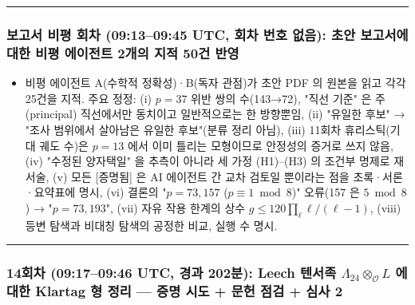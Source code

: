 \begin{center}\rule{0.5\linewidth}{0.5pt}\end{center}

\hypertarget{uxbcf4uxace0uxc11c-uxbe44uxd3c9-uxd68cuxcc28-09130945-utc-uxd68cuxcc28-uxbc88uxd638-uxc5c6uxc74c-uxcd08uxc548-uxbcf4uxace0uxc11cuxc5d0-uxb300uxd55c-uxbe44uxd3c9-uxc5d0uxc774uxc804uxd2b8-2uxac1cuxc758-uxc9c0uxc801-50uxac74-uxbc18uxc601}{%
\subsubsection*{보고서 비평 회차 (09:13--09:45 UTC, 회차 번호 없음): 초안 보고서에 대한 비평 에이전트 2개의 지적 50건 반영}\label{uxbcf4uxace0uxc11c-uxbe44uxd3c9-uxd68cuxcc28-09130945-utc-uxd68cuxcc28-uxbc88uxd638-uxc5c6uxc74c-uxcd08uxc548-uxbcf4uxace0uxc11cuxc5d0-uxb300uxd55c-uxbe44uxd3c9-uxc5d0uxc774uxc804uxd2b8-2uxac1cuxc758-uxc9c0uxc801-50uxac74-uxbc18uxc601}}

\begin{itemize}
\tightlist
\item
  비평 에이전트 A(수학적 정확성)·B(독자 관점)가 초안 PDF 의 원본을 읽고 각각 25건을 지적. 주요 정정: (i) \(p=37\) 위반 쌍의 수(143→72), "직선 기준" 은 주(principal) 직선에서만 동치이고 일반적으로는 한 방향뿐임, (ii) "유일한 후보" → "조사 범위에서 살아남은 유일한 후보"(분류 정리 아님), (iii) 11회차 휴리스틱(기대 궤도 수)은 \(p=13\) 에서 이미 틀리는 모형이므로 안정성의 증거로 쓰지 않음, (iv) "수정된 양자택일" 을 추측이 아니라 세 가정 (H1)--(H3) 의 조건부 명제로 재서술, (v) 모든 {[}증명됨{]} 은 AI 에이전트 간 교차 검토일 뿐이라는 점을 초록·서론·요약표에 명시, (vi) 결론의 "\(p=73,157\) (\(p\equiv1\bmod8\))" 오류(157 은 \(5\bmod8\)) → "\(p=73,193\)", (vii) 자유 작용 한계의 상수 \(g\le120\prod_\ell\ell/(\ell-1)\), (viii) 등변 탐색과 비대칭 탐색의 공정한 비교, 실행 수 명시.
\end{itemize}

\begin{center}\rule{0.5\linewidth}{0.5pt}\end{center}

\hypertarget{uxd68cuxcc28-09170946-utc-uxacbduxacfc-202uxbd84-leech-uxd150uxc11cuxc871-lambda_24otimes_mathcal-ol-uxc5d0-uxb300uxd55c-klartag-uxd615-uxc815uxb9ac-uxc99duxba85-uxc2dcuxb3c4-uxbb38uxd5cc-uxc810uxac80-uxc2ecuxc0ac-2}{%
\subsubsection*{\texorpdfstring{14회차 (09:17--09:46 UTC, 경과 202분): Leech 텐서족 \(\Lambda_{24}\otimes_{\mathcal O}L\) 에 대한 Klartag 형 정리 --- 증명 시도 + 문헌 점검 + 심사 2}{14회차 (09:17--09:46 UTC, 경과 202분): Leech 텐서족 \textbackslash Lambda\_\{24\}\textbackslash otimes\_\{\textbackslash mathcal O\}L 에 대한 Klartag 형 정리 --- 증명 시도 + 문헌 점검 + 심사 2}}\label{uxd68cuxcc28-09170946-utc-uxacbduxacfc-202uxbd84-leech-uxd150uxc11cuxc871-lambda_24otimes_mathcal-ol-uxc5d0-uxb300uxd55c-klartag-uxd615-uxc815uxb9ac-uxc99duxba85-uxc2dcuxb3c4-uxbb38uxd5cc-uxc810uxac80-uxc2ecuxc0ac-2}}

